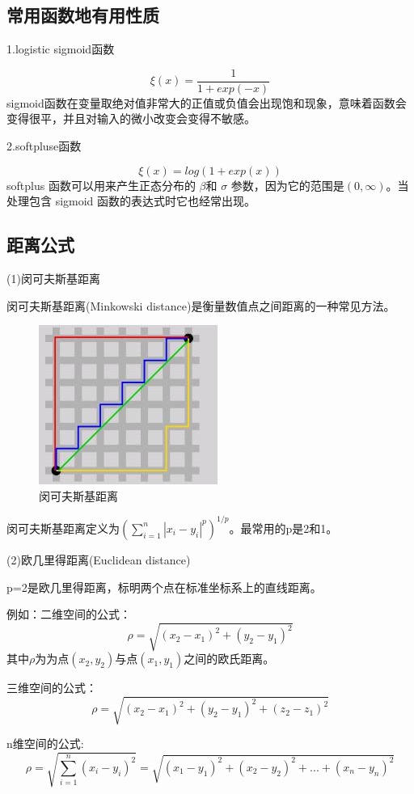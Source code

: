 \documentclass[openbib]{article}
\begin{document}
\subsection{常用函数地有用性质}
\begin{center}
	1.logistic sigmoid函数
\end{center}
$$\xi(x) = \frac{1}{1+exp(-x)}$$
sigmoid函数在变量取绝对值非常大的正值或负值会出现饱和现象，意味着函数会变得很平，并且对输入的微小改变会变得不敏感。
\begin{center}
	2.softpluse函数
\end{center}
$$\xi(x)=log(1+exp(x))$$
softplus 函数可以用来产生正态分布的 $\beta$和 $\sigma$ 参数，因为它的范围是$(0,\infty)$。当处理包含 sigmoid 函数的表达式时它也经常出现。
\subsection{距离公式}
(1)闵可夫斯基距离

闵可夫斯基距离(Minkowski distance)是衡量数值点之间距离的一种常见方法。
\begin{figure}[htbp]
	\centering
	\includegraphics[scale=1]{闵可夫斯基距离.jpg}
	\caption{闵可夫斯基距离}
	\label{a}
\end{figure}

闵可夫斯基距离定义为$\left( \sum_{i=1}^{n}\left| x_{i}-y_{i} \right|^{p} \right)^{1/p}$。最常用的p是2和1。

(2)欧几里得距离(Euclidean distance)

p=2是欧几里得距离，标明两个点在标准坐标系上的直线距离。

例如：二维空间的公式：
$$\rho=\sqrt{(x_{2}- x_{1})^2+(y_{2}-y_{1})^2}$$其中$\rho$为为点$(x_{2},y_{2})$与点$(x_{1},y_{1})$之间的欧氏距离。

三维空间的公式：$$\rho=\sqrt{(x_{2}- x_{1})^2+(y_{2}-y_{1})^2+(z_{2}-z_{1})^2}$$

n维空间的公式:$$\rho=\sqrt{\sum_{i=1}^{n}(x_i-y_i)^2}=\sqrt{(x_{1}- y_{1})^2+(x_{2}-y_{2})^2+...+(x_{n}-y_{n})^2}$$
\end{document}
